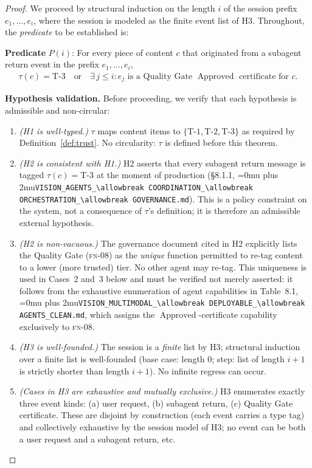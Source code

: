 \documentclass[12pt]{article}
\theoremstyle{definition}
\DeclareRobustCommand{\code}[1]{\begingroup\Urlmuskip=0mu plus 2mu\relax\nolinkurl{#1}\endgroup}
\newcommand{\FN}[1]{\textsc{fn-#1}}
\DeclareMathOperator{\Approved}{Approved}
\newcommand{\VisionClean}{\code{VISION\_MULTIMODAL\_\allowbreak DEPLOYABLE\_\allowbreak AGENTS\_CLEAN.md}}
\newcommand{\VisionGov}{\code{VISION\_AGENTS\_\allowbreak COORDINATION\_\allowbreak ORCHESTRATION\_\allowbreak GOVERNANCE.md}}
\begin{document}
\begin{proof}
We proceed by structural induction on the length $i$ of the session
prefix $e_1,\ldots,e_i$, where the session is modeled as the finite event
list of H3.  Throughout, the \emph{predicate} to be established is:

\medskip
\noindent\textbf{Predicate} $P(i)$: For every piece of content $c$ that
originated from a subagent return event in the prefix $e_1,\ldots,e_i$,
\begin{align}
    \label{eq:pred}
    \tau(c) = \mathrm{T\text{-}3}
    \quad\text{or}\quad
    \exists\, j \leq i : e_j \text{ is a Quality Gate }
    \Approved\text{ certificate for }c.
\end{align}

\medskip
\noindent\textbf{Hypothesis validation.}  Before proceeding, we verify
that each hypothesis is admissible and non-circular:
\begin{enumerate}
    \item[V.1] \emph{(H1 is well-typed.)} $\tau$ maps content items to
               $\{\mathrm{T\text{-}1},\mathrm{T\text{-}2},\mathrm{T\text{-}3}\}$
               as required by Definition~\ref{def:trust}.  No circularity:
               $\tau$ is defined before this theorem.
    \item[V.2] \emph{(H2 is consistent with H1.)} H2 asserts that every
               subagent return message is tagged $\tau(c)=\mathrm{T\text{-}3}$
               at the moment of production
               (\S8.1.1, \VisionGov{}).
               This is a policy constraint on the system, not a
               consequence of $\tau$'s definition; it is therefore an
               admissible external hypothesis.
    \item[V.3] \emph{(H2 is non-vacuous.)} The governance document cited
               in H2 explicitly lists the Quality Gate (\FN{08}) as the
               \emph{unique} function permitted to re-tag content to a
               lower (more trusted) tier.  No other agent may re-tag.
               This uniqueness is used in Cases~2 and~3 below and must be
               verified not merely asserted: it follows from the exhaustive
               enumeration of agent capabilities in Table~8.1,
               \VisionClean{},
               which assigns the $\Approved$-certificate capability
               exclusively to \FN{08}.
    \item[V.4] \emph{(H3 is well-founded.)} The session is a \emph{finite}
               list by H3; structural induction over a finite list is
               well-founded (base case: length 0; step: list of length
               $i+1$ is strictly shorter than length $i+1$).
               No infinite regress can occur.
    \item[V.5] \emph{(Cases in H3 are exhaustive and mutually exclusive.)}
               H3 enumerates exactly three event kinds:
               (a) user request, (b) subagent return, (c) Quality Gate
               certificate.  These are disjoint by construction (each event
               carries a type tag) and collectively exhaustive by the
               session model of H3; no event can be both a user request and
               a subagent return, etc.
\end{enumerate}


\end{proof}
\end{document}
